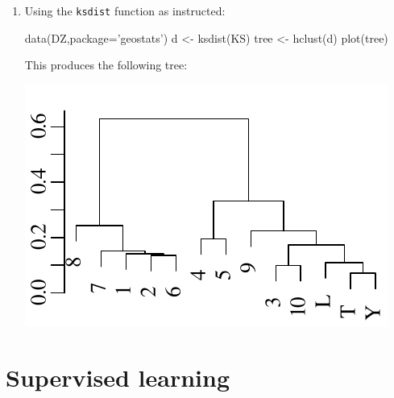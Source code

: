 \begin{enumerate}
\item Using the \texttt{ksdist} function as instructed:

\begin{script}
data(DZ,package='geostats')
d <- ksdist(KS)
tree <- hclust(d)
plot(tree)
\end{script}

This produces the following tree:

\noindent\begin{minipage}[t][][b]{.35\indentwidth}
\includegraphics[width=\textwidth]{../figures/DZtree.pdf}\\
\end{minipage}
\begin{minipage}[t][][t]{.65\indentwidth}
  \label{fig:DZtree}
\end{minipage}

\end{enumerate}

\section{Supervised learning}
\label{sec:sol-supervised}

